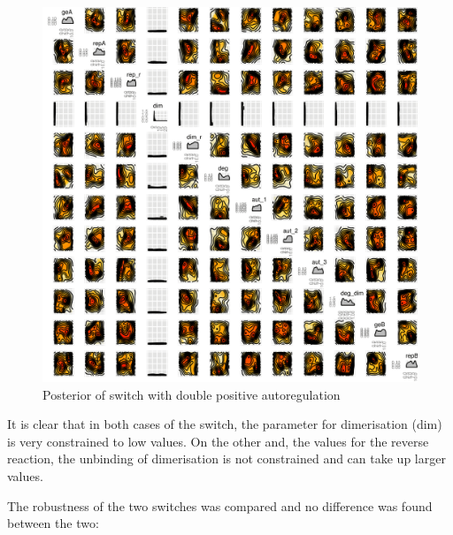 \begin{figure}[htbp]
\begin{center}
\includegraphics[scale=0.15]{chapterModelling/mass_action_switches/bi_tri_same_priors/posterior_pos_ab_tri.png}
\caption{Posterior of switch with double positive autoregulation}\label{fig_3}
\end{center}
\end{figure}
\clearpage
It is clear that in both cases of the switch, the parameter for dimerisation (dim) is very constrained to low values. On the other and, the values for the reverse reaction, the unbinding of dimerisation is not constrained and can take up larger values. 

The robustness of the two switches was compared and no difference was found between the two:

